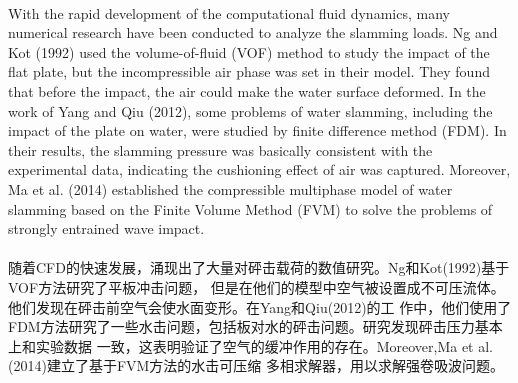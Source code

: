 \documentclass[UTF8]{ctexart}
\begin{document}
\paragraph{\quad}With the rapid development of the computational fluid dynamics, many numerical
                research have been conducted to analyze the slamming loads. Ng and Kot (1992) 
                used the volume-of-fluid (VOF) method to study the impact of the flat plate, 
                but the incompressible air phase was set in their model. They found that before 
                the impact, the air could make the water surface deformed. In the work of Yang 
                and Qiu (2012), some problems of water slamming, including the impact of the 
                plate on water, were studied by finite difference method (FDM). In their results, 
                the slamming pressure was basically consistent with the experimental data, 
                indicating the cushioning effect of air was captured. Moreover, Ma et al. (2014) 
                established the compressible multiphase model of water slamming based on the 
                Finite Volume Method (FVM) to solve the problems of strongly entrained wave impact.
\paragraph{\quad}随着CFD的快速发展，涌现出了大量对砰击载荷的数值研究。Ng和Kot(1992)基于VOF方法研究了平板冲击问题，
                但是在他们的模型中空气被设置成不可压流体。他们发现在砰击前空气会使水面变形。在Yang和Qiu(2012)的工
                作中，他们使用了FDM方法研究了一些水击问题，包括板对水的砰击问题。研究发现砰击压力基本上和实验数据
                一致，这表明验证了空气的缓冲作用的存在。Moreover,Ma et al.(2014)建立了基于FVM方法的水击可压缩
                多相求解器，用以求解强卷吸波问题。
\end{document}
